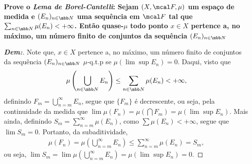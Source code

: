 \newpage 
{}
\bigline 
\textbf{Prove o \textit{Lema de Borel-Cantelli}: Sejam $(X, \mcal F, \mu)$ um espaço 
de medida e $(E_n)_{n \in \mbb N}$ uma sequência em $\mcal F$ tal que 
$\sum_{n \in \mbb N} \mu(E_n) < +\infty$. Então quase-$\mu$ todo ponto $x \in X$ pertence a, 
no máximo, um número finito de conjuntos da sequência $(E_n)_{n \in \mbb N}$}
\begin{proof}[\textbf{Dem:}] Note que, $x\in X$ pertence a, no máximo, um número 
  finito de conjuntos da sequência $(E_n)_{n \in \mbb N}$ $\mu$-q.t.p se 
  $\mu(\lim\sup E_n) = 0$. Daqui, visto que 
  \begin{align*}
    \mu\left(\bigcup\limits_{n \in \mbb N}
    E_n\right) \le \sum_{n \in \mbb N} \mu(E_n) < +\infty,
  \end{align*}
  definindo $F_m = \bigcup_{n = m}^\infty E_n$, 
  segue que $\{F_m\}$ é decrescente, ou seja, 
  pela continuidade da medida que $\lim \mu (F_n) = \mu(\bigcap F_m) = \mu(\lim\sup E_n)$. 
  Mais ainda, definindo $S_m = \sum_{n = m}^\infty \mu(E_n)$, como $\sum \mu(E_n) < +\infty$,
  segue que $\lim S_m = 0$. Portanto, da subaditividade, 
  \begin{align*}
    \mu(F_n) = \mu\left(\bigcup\limits_{n = m}^\infty E_n\right)
    \le \sum_{n = m}^\infty \mu(E_n) = S_m,
  \end{align*}
  ou seja, $\lim S_m = \lim \mu\left(\bigcup\limits_{n = m}^\infty E_n\right) 
  = \mu(\lim\sup E_n) = 0$.
\end{proof}
\biglinend


